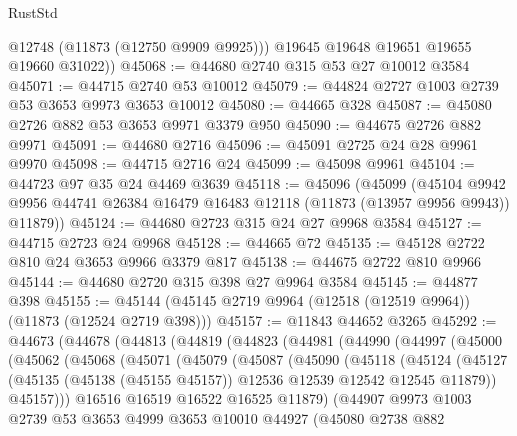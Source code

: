 \begin{lexlean}{RustStd}
\begin{coremodule}
          @12748
          (@11873 (@12750 @9909 @9925)))
        @19645
        @19648
        @19651
        @19655
        @19660
        @31022))
@45068 := @44680 @2740 @315 @53 @27 @10012 @3584
@45071 := @44715 @2740 @53 @10012
@45079 := @44824 @2727 @1003 @2739 @53 @3653 @9973 @3653 @10012
@45080 := @44665 @328
@45087 := @45080 @2726 @882 @53 @3653 @9971 @3379 @950
@45090 := @44675 @2726 @882 @9971
@45091 := @44680 @2716
@45096 := @45091 @2725 @24 @28 @9961 @9970
@45098 := @44715 @2716 @24
@45099 := @45098 @9961
@45104 := @44723 @97 @35 @24 @4469 @3639
@45118 := @45096
    (@45099
      (@45104 @9942 @9956 @44741 @26384 @16479 @16483 @12118 (@11873 (@13957 @9956 @9943)) @11879))
@45124 := @44680 @2723 @315 @24 @27 @9968 @3584
@45127 := @44715 @2723 @24 @9968
@45128 := @44665 @72
@45135 := @45128 @2722 @810 @24 @3653 @9966 @3379 @817
@45138 := @44675 @2722 @810 @9966
@45144 := @44680 @2720 @315 @398 @27 @9964 @3584
@45145 := @44877 @398
@45155 := @45144 (@45145 @2719 @9964 (@12518 (@12519 @9964)) (@11873 (@12524 @2719 @398)))
@45157 := @11843 @44652 @3265
@45292 := @44673
    (@44678
      (@44813
        (@44819
          (@44823
            (@44981
              (@44990
                (@44997
                  (@45000
                    (@45062
                      (@45068
                        (@45071
                          (@45079
                            (@45087
                              (@45090
                                (@45118
                                  (@45124
                                    (@45127
                                      (@45135
                                        (@45138 (@45155 @45157))
                                        @12536
                                        @12539
                                        @12542
                                        @12545
                                        @11879))
                                    @45157)))
                              @16516
                              @16519
                              @16522
                              @16525
                              @11879)
                            (@44907
                              @9973
                              @1003
                              @2739
                              @53
                              @3653
                              @4999
                              @3653
                              @10010
                              @44927
                              (@45080
                                @2738
                                @882

\end{coremodule}
\end{lexlean}
